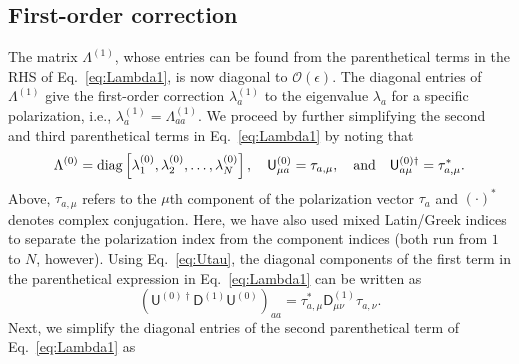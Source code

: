 \subsection{First-order correction}

The matrix $\Lambda^{(1)}$, whose entries can be found from the parenthetical terms in the RHS of Eq.~\eqref{eq:Lambda1}, is now diagonal to $\mathcal{O}(\epsilon)$.
The diagonal entries of $\Lambda^{(1)}$ give the first-order correction $\lambda_{a}^{(1)}$ to the eigenvalue $\lambda_{a}$ for a specific polarization, i.e., $\lambda_{a}^{(1)} = \Lambda^{(1)}_{aa}$.
We proceed by further simplifying the second and third parenthetical terms in Eq.~\eqref{eq:Lambda1} by noting that
%
\begin{equation}
  \Lambda^{(0)} = \operatorname{diag}\left[\lambda^{(0)}_{1}, \lambda^{(0)}_{2}, \ldots, \lambda^{(0)}_{N}\right],
  \quad
  \mathsf{U}^{(0)}_{\mu a} = \tau_{a, \mu},
  \quad\text{and}\quad
  \mathsf{U}^{(0)\dagger}_{a \mu} = \tau^{*}_{a, \mu}.
  \label{eq:Utau}
\end{equation}
%
Above, $\tau_{a, \mu}$ refers to the $\mu$th component of the polarization vector $\tau_{a}$ and $(\cdot)^{*}$ denotes complex conjugation.
Here, we have also used mixed Latin/Greek indices to separate the polarization index from the component indices (both run from $1$ to $N$, however).
Using Eq.~\eqref{eq:Utau}, the diagonal components of the first term in the parenthetical expression in Eq.~\eqref{eq:Lambda1} can be written as
%
\begin{equation}
\left(\mathsf{U}^{(0)\dagger}\mathsf{D}^{(1)}\mathsf{U}^{(0)}\right)_{aa} = \tau_{a,\mu}^{*}\mathsf{D}^{(1)}_{\mu\nu}\tau_{a,\nu}.
\label{eq:1st_term}
\end{equation}
%
Next, we simplify the diagonal entries of the second parenthetical term of Eq.~\eqref{eq:Lambda1} as
%
